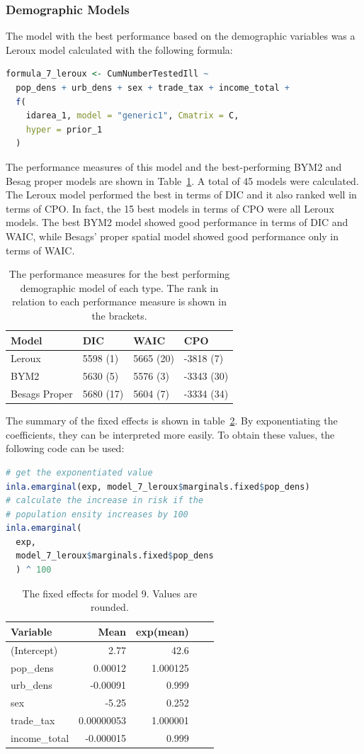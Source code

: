 \subsubsection{Demographic Models}
The model with the best performance based on the demographic variables was a Leroux model calculated with the following formula:
\begin{lstlisting}[language=R]
formula_7_leroux <- CumNumberTestedIll ~
  pop_dens + urb_dens + sex + trade_tax + income_total +
  f(
    idarea_1, model = "generic1", Cmatrix = C,
    hyper = prior_1
  )
\end{lstlisting}
The performance measures of this model and the best-performing BYM2 and Besag proper models are shown in Table~\ref{demoGermany}. A total of 45 models were calculated. The Leroux model performed the best in terms of DIC and it also ranked well in terms of CPO. In fact, the 15 best models in terms of CPO were all Leroux models. The best BYM2 model showed good performance in terms of DIC and WAIC, while Besags' proper spatial model showed good performance only in terms of WAIC.
\begin{table}[H] 
\caption{The performance measures for the best performing demographic model of each type. The rank in relation to each performance measure is shown in the brackets. \label{demoGermany}}
\begin{tabular}{l l l l}
\toprule
\textbf{Model}	& \textbf{DIC}	& \textbf{WAIC} & \textbf{CPO} \\
\midrule
Leroux & 5598 (1) & 5665 (20) & -3818 (7) \\
BYM2 & 5630 (5) & 5576 (3) & -3343 (30)\\
Besags Proper  & 5680 (17) & 5604 (7) & -3334 (34) \\
\bottomrule
\end{tabular}
\end{table}
The summary of the fixed effects is shown in table~\ref{fixedDemoGermany}. By exponentiating the coefficients, they can be interpreted more easily. To obtain these values, the following code can be used:
\begin{lstlisting}[language=R]
# get the exponentiated value
inla.emarginal(exp, model_7_leroux$marginals.fixed$pop_dens)
# calculate the increase in risk if the 
# population ensity increases by 100
inla.emarginal(
  exp,
  model_7_leroux$marginals.fixed$pop_dens
  ) ^ 100
\end{lstlisting}
\begin{table}[H] 
\caption{The fixed effects for model 9. Values are rounded. \label{fixedDemoGermany}}
\begin{tabular}{l r r r r}
\toprule
\textbf{Variable}	& \textbf{Mean}	& \textbf{exp(mean)} \\
\midrule
(Intercept) & 2.77 & 42.6\\
pop\_dens & 0.00012 & 1.000125\\
urb\_dens &  -0.00091 & 0.999\\
sex & -5.25 & 0.252\\
trade\_tax & 0.00000053& 1.000001 \\
income\_total & -0.000015 & 0.999\\
\bottomrule
\end{tabular}
\end{table}
